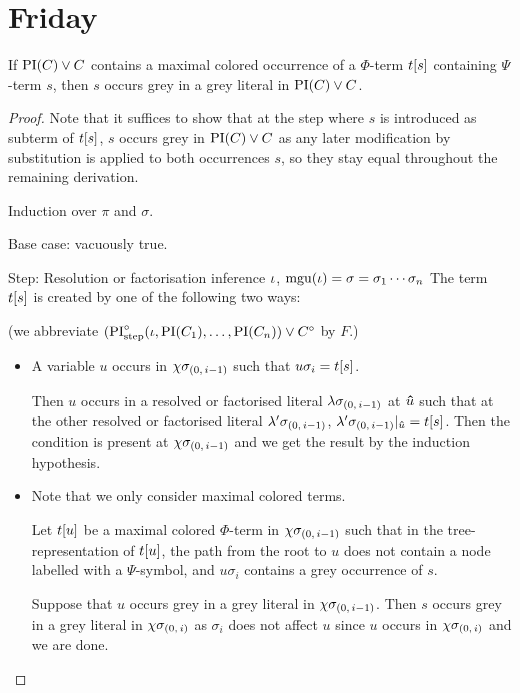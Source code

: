\documentclass[,%
	draft=false,%
	numbers=noendperiod
	12pt,
	a4paper,
	oneside,%
	openany,
]{memoir}
\newcommand{\inv}{\ensuremath{\chi}}
\begin{document}
\section{Friday}

\begin{lemma}
	If ${\operatorname{PI}(C) \lor C}$ contains a maximal colored occurrence of a $\Phi$-term $t[s]$ containing $\Psi$-term $s$, then 
	$s$ occurs grey in a grey literal in $\operatorname{PI}(C) \lor C$.
\end{lemma}
\begin{proof}
	Note that it suffices to show that at the step where $s$ is introduced as subterm of $t[s]$, $s$ occurs grey in $\operatorname{PI}(C) \lor C$ as any later modification by substitution is applied to both occurrences $s$, so they stay equal throughout the remaining derivation.
	\medskip

	\noindent
	Induction over $\pi$ and $\sigma$. 
	\medskip

	\noindent
	Base case: vacuously true.
	\medskip

	\noindent
	Step:
	Resolution or factorisation inference $\iota$, $\operatorname{mgu}(\iota) = \sigma = \sigma_1\cdots\sigma_n$ 
	The term $t[s]$ is created by one of the following two ways: 

	(we abbreviate 
	$(\operatorname{PI}^\circ_{\mathrm{step}}(\iota, \operatorname{PI}(C_1), \dots, \operatorname{PI}(C_n)) \lor C^\circ$ by $F$.)
	\begin{itemize}
		\item
			A variable $u$ occurs in $\inv\sigmazmi$ such that $u\sigma_i = t[s]$.

			Then $u$ occurs in a resolved or factorised literal $\lambda\sigma_{(0,\,i-1)}$ at $\bm\hat u$ such that at the other resolved or factorised literal $\lambda'\sigma_{(0,\,i-1)}$, $\lambda'\sigma_{(0,\,i-1)}|_{\bm\hat u} = t[s]$.
			Then the condition is present at $\inv\sigmazmi$ and we get the result by the induction hypothesis.

		\item 
			Note that we only consider maximal colored terms.

			Let $t[u]$ be a maximal colored $\Phi$-term in $\inv\sigmazmi$ such that in the tree-representation of $t[u]$, the path from the root to $u$ does not contain a node labelled with a $\Psi$-symbol, and $u\sigma_i$ contains a grey occurrence of $s$.


			Suppose that $u$ occurs grey in a grey literal in $\inv\sigmazmi$.
			Then $s$ occurs grey in a grey literal in $\inv\sigmazi$ as $\sigma_i$ does not affect $u$ since $u$ occurs in $\inv\sigmazi$ and we are done.


\end{itemize}
\end{proof}
\end{document}
